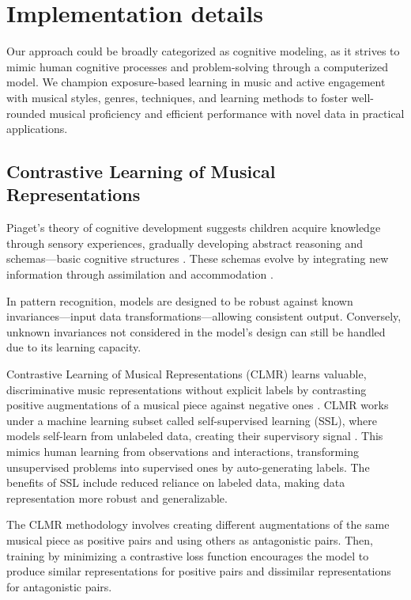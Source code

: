 \section{Implementation details}

Our approach could be broadly categorized as cognitive modeling, as it strives to mimic human cognitive processes and problem-solving through a computerized model. We champion exposure-based learning in music and active engagement with musical styles, genres, techniques, and learning methods to foster well-rounded musical proficiency and efficient performance with novel data in practical applications.

\subsection{Contrastive Learning of Musical Representations}

Piaget's theory of cognitive development suggests children acquire knowledge through sensory experiences, gradually developing abstract reasoning and schemas—basic cognitive structures \cite{Huitt2003PiagetsDevelopment}. These schemas evolve by integrating new information through assimilation and accommodation \cite{audioselfsupsurvey}.

In pattern recognition, models are designed to be robust against known invariances—input data transformations—allowing consistent output. Conversely, unknown invariances not considered in the model's design can still be handled due to its learning capacity.

Contrastive Learning of Musical Representations (CLMR) learns valuable, discriminative music representations without explicit labels by contrasting positive augmentations of a musical piece against negative ones \cite{CLMR2021}. CLMR works under a machine learning subset called self-supervised learning (SSL), where models self-learn from unlabeled data, creating their supervisory signal \cite{audioselfsupsurvey}. This mimics human learning from observations and interactions, transforming unsupervised problems into supervised ones by auto-generating labels. The benefits of SSL include reduced reliance on labeled data, making data representation more robust and generalizable. 

The CLMR methodology involves creating different augmentations of the same musical piece as positive pairs and using others as antagonistic pairs. Then, training by minimizing a contrastive loss function encourages the model to produce similar representations for positive pairs and dissimilar representations for antagonistic pairs.

